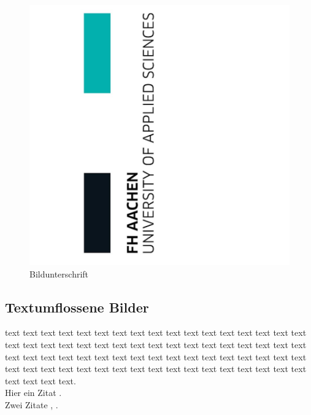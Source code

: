 \begin{figure}[H]
	\centering
		\includegraphics[width=1.0\textwidth]{pic/fhac_2.jpg}
	\caption{Bildunterschrift}
	\label{fig:fhaachen}
\end{figure}
\vspace{1cm} %

\newpage


\subsection*{Textumflossene Bilder }


text text text text text text text text text text text text text text text text text text text text text text text text text text text text text text text text text text text text text text text text text text text text text text text text text text text text text text text text text text text text text text text text text text text text text text text text.\\
Hier ein Zitat \cite{book}. \\
Zwei Zitate \cite{book}, \cite{manual}.\\


